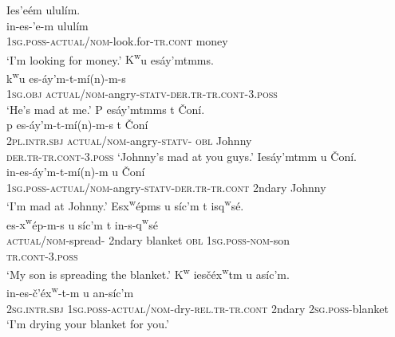 \documentclass[output=paper,colorlinks,citecolor=brown]{langscibook}
\begin{document}
\ea 
\label{ex-thomason-24}
Ies{\textcrlambda}'e\textglotstop\'em ulul\'im.  \\
\gll in-es-{\textcrlambda}'e\textglotstop-m ulul\'im \\
\textsc{1sg}.\textsc{poss}-\textsc{actual/nom}-look.for-\textsc{tr.cont} money \\
\glt `I'm looking for money.'
\ex 
\label{ex-thomason-25}
{K\textsuperscript w}u es\'ay'mtmms. \\
\gll  
{k\textsuperscript w}u es-\textrevglotstop\'ay'm-t-m\'i(n)-m-s \\
\textsc{1sg}.\textsc{obj} \textsc{actual/nom}-angry-\textsc{statv-der.tr-tr.cont}-3.\textsc{poss} \\
\glt `He's mad at me.'
\ex 
\label{ex-thomason-26}
P es\'ay'mtmms t \v{C}on\'i.  \\
\gll p es-\textrevglotstop\'ay'm-t-m\'i(n)-m-s t \v{C}on\'i \\
\textsc{2pl}.\textsc{intr.sbj} \textsc{actual/nom}-angry-\textsc{statv-}
 \textsc{obl} Johnny \\
\textsc{der.tr-tr.cont}-3.\textsc{poss}
\glt `Johnny's mad at you guys.' 
\ex 
\label{ex-thomason-27}
Ies\textrevglotstop\'ay'mtmm {\textltilde}u \v{C}on\'i. \\
\gll in-es-\textrevglotstop\'ay'm-t-m\'i(n)-m {\textltilde}u \v{C}on\'i \\ 
\textsc{1sg}.\textsc{poss}-\textsc{actual/nom}-angry-\textsc{statv-der.tr-tr.cont} 2ndary Johnny \\
\glt `I'm mad at Johnny.'
\ex 
\label{ex-thomason-28}
Es{x\textsuperscript w}\'epms {\textltilde}u s\'ic'm t is{q\textsuperscript w}s\'e{\textglotstop}. \\
 \gll es-{x\textsuperscript w}\'ep-m-s {\textltilde}u s\'ic'm t
   in-s-{q\textsuperscript w}s\'e{\textglotstop} \\
\textsc{actual/nom}-spread- 2ndary
blanket \textsc{obl} \textsc{1sg}.\textsc{poss}-\textsc{nom}-son\\
\textsc{tr.cont}-3.\textsc{poss} \\
 \glt `My son is spreading the blanket.'
\ex 
\label{ex-thomason-29}
{K\textsuperscript w} ies\v{c}\'e{x\textsuperscript w}{\textltilde}tm {\textltilde}u as\'ic'm. \\
    in-es-\v{c}'\'e{x\textsuperscript
 w}-{\textltilde}t-m {\textltilde}u an-s\'ic'm \\
\textsc{2sg}.\textsc{intr.sbj} \textsc{1sg}.\textsc{poss}-\textsc{actual/nom}-dry-\textsc{rel.tr-tr.cont} 2ndary \textsc{2sg}.\textsc{poss}-blanket \\
   \glt `I'm drying your blanket for you.'
\z
\end{document}
